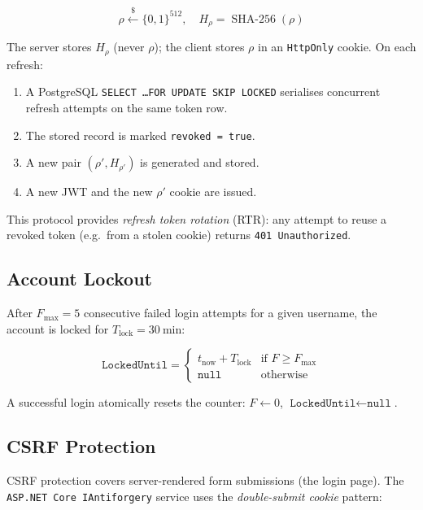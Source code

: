 \documentclass[12pt,a4paper]{article}
\theoremstyle{definition}
\theoremstyle{plain}
\theoremstyle{remark}
\newcommand{\SHA}{\operatorname{SHA\text{-}256}}
\begin{document}
\begin{equation}
  \rho \xleftarrow{\$} \{0,1\}^{512}, \quad
  H_\rho = \SHA(\rho)
  \label{eq:refresh_token}
\end{equation}

The server stores $H_\rho$ (never $\rho$); the client stores $\rho$ in an
\texttt{HttpOnly} cookie. On each refresh:

\begin{enumerate}
  \item A PostgreSQL \texttt{SELECT \ldots FOR UPDATE SKIP LOCKED}
    serialises concurrent refresh attempts on the same token row.
  \item The stored record is marked \texttt{revoked = true}.
  \item A new pair $(\rho', H_{\rho'})$ is generated and stored.
  \item A new JWT and the new $\rho'$ cookie are issued.
\end{enumerate}

This protocol provides \emph{refresh token rotation} (RTR): any attempt
to reuse a revoked token (e.g.\ from a stolen cookie) returns
\texttt{401 Unauthorized}.

\subsection{Account Lockout}
\label{sec:lockout}

After $F_{\max} = 5$ consecutive failed login attempts for a given username,
the account is locked for $T_{\text{lock}} = 30\ \mathrm{min}$:

\begin{equation}
  \texttt{LockedUntil} =
  \begin{cases}
    t_{\text{now}} + T_{\text{lock}} & \text{if } F \geq F_{\max} \\
    \texttt{null}                    & \text{otherwise}
  \end{cases}
  \label{eq:lockout}
\end{equation}

A successful login atomically resets the counter:
$F \leftarrow 0$, $\texttt{LockedUntil} \leftarrow \texttt{null}$.

\subsection{CSRF Protection}

CSRF protection covers server-rendered form submissions (the login page)\cite{owasp_csrf}.
The \texttt{ASP.NET Core IAntiforgery} service uses the \emph{double-submit
cookie} pattern:
\end{document}
